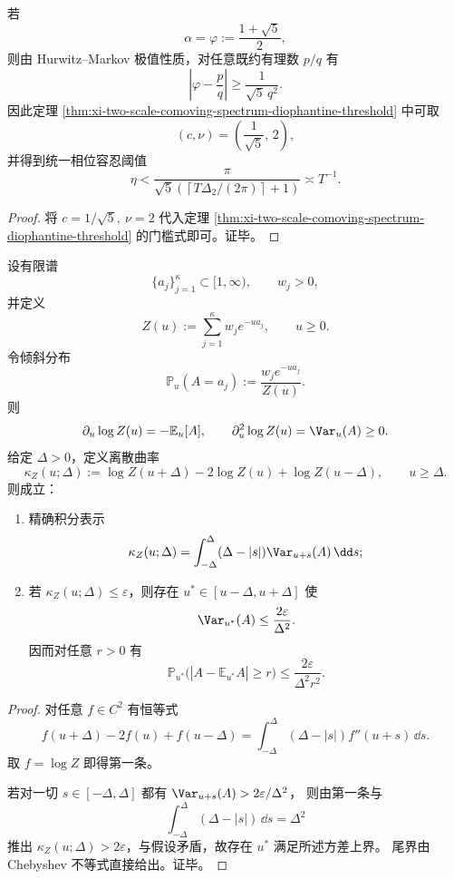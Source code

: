 \begin{corollary}[黄金比例步长比值的统一门槛常数]\label{cor:xi-golden-ratio-stepsize-unaliasing-threshold}
若
\[
\alpha=\varphi:=\frac{1+\sqrt5}{2},
\]
则由 Hurwitz--Markov 极值性质，对任意既约有理数 \(p/q\) 有
\[
\left|\varphi-\frac{p}{q}\right|\ge\frac{1}{\sqrt5\,q^2}.
\]
因此定理 \ref{thm:xi-two-scale-comoving-spectrum-diophantine-threshold} 中可取
\[
(c,\nu)=\left(\frac1{\sqrt5},\,2\right),
\]
并得到统一相位容忍阈值
\[
\eta<
\frac{\pi}{
\sqrt5\left(\left\lceil T\Delta_2/(2\pi)\right\rceil+1\right)
}
\asymp T^{-1}.
\]
\end{corollary}
\begin{proof}
将
\(
c=1/\sqrt5,\ \nu=2
\)
代入定理 \ref{thm:xi-two-scale-comoving-spectrum-diophantine-threshold} 的门槛式即可。证毕。
\end{proof}

\begin{theorem}[离散曲率控制下的近单模态刚性]\label{thm:xi-discrete-curvature-near-unimodal-rigidity}
设有限谱
\[
\{a_j\}_{j=1}^{\kappa}\subset[1,\infty),\qquad w_j>0,
\]
并定义
\[
Z(u):=\sum_{j=1}^{\kappa}w_j e^{-ua_j},\qquad u\ge0.
\]
令倾斜分布
\[
\mathbb P_u(A=a_j):=\frac{w_j e^{-ua_j}}{Z(u)}.
\]
则
\[
\partial_u\log Z(u)=-\mathbb E_u[A],\qquad
\partial_u^2\log Z(u)=\Var_u(A)\ge0.
\]
给定 \(\Delta>0\)，定义离散曲率
\[
\kappa_Z(u;\Delta):=\log Z(u+\Delta)-2\log Z(u)+\log Z(u-\Delta),
\qquad u\ge\Delta.
\]
则成立：
\begin{enumerate}
  \item 精确积分表示
  \[
  \kappa_Z(u;\Delta)=
  \int_{-\Delta}^{\Delta}(\Delta-|s|)\Var_{u+s}(A)\,\dd s;
  \]
  \item 若 \(\kappa_Z(u;\Delta)\le\varepsilon\)，则存在 \(u^\ast\in[u-\Delta,u+\Delta]\) 使
  \[
  \Var_{u^\ast}(A)\le\frac{2\varepsilon}{\Delta^2}.
  \]
  因而对任意 \(r>0\) 有
  \[
  \mathbb P_{u^\ast}\!\bigl(|A-\mathbb E_{u^\ast}A|\ge r\bigr)
  \le
  \frac{2\varepsilon}{\Delta^2r^2}.
  \]
\end{enumerate}
\end{theorem}
\begin{proof}
对任意 \(f\in C^2\) 有恒等式
\[
f(u+\Delta)-2f(u)+f(u-\Delta)
=
\int_{-\Delta}^{\Delta}(\Delta-|s|)f''(u+s)\,\dd s.
\]
取 \(f=\log Z\) 即得第一条。

若对一切 \(s\in[-\Delta,\Delta]\) 都有
\(
\Var_{u+s}(A)>2\varepsilon/\Delta^2
\)，
则由第一条与
\[
\int_{-\Delta}^{\Delta}(\Delta-|s|)\,\dd s=\Delta^2
\]
推出 \(\kappa_Z(u;\Delta)>2\varepsilon\)，与假设矛盾，故存在 \(u^\ast\) 满足所述方差上界。
尾界由 Chebyshev 不等式直接给出。证毕。
\end{proof}

